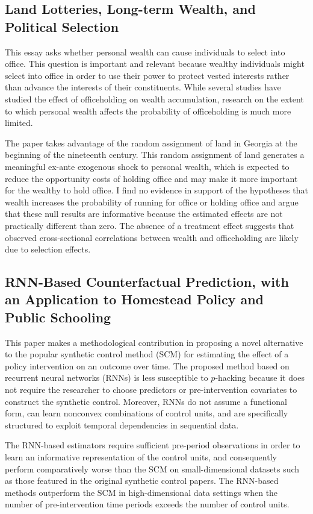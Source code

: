 \subsection{Land Lotteries, Long-term Wealth, and Political Selection} 
This essay asks whether personal wealth can cause individuals to select into office. This question is important and relevant because wealthy individuals might select into office in order to use their power to protect vested interests rather than advance the interests of their constituents. While several studies have studied the effect of officeholding on wealth accumulation, research on the extent to which personal wealth affects the probability of officeholding is much more limited.

The paper takes advantage of the random assignment of land in Georgia at the beginning of the nineteenth century. This random assignment of land generates a meaningful ex-ante exogenous shock to personal wealth, which is expected to reduce the opportunity costs of holding office and may make it more important for the wealthy to hold office. I find no evidence in support of the hypotheses that wealth increases the probability of running for office or holding office and argue that these null results are informative because the estimated effects are not practically different than zero. The absence of a treatment effect suggests that observed cross-sectional correlations between wealth and officeholding are likely due to selection effects. 

\subsection{RNN-Based Counterfactual Prediction, with an Application to Homestead Policy and Public Schooling}

This paper makes a methodological contribution in proposing a novel alternative to the popular synthetic control method (SCM) for estimating the effect of a policy intervention on an outcome over time. The proposed method based on recurrent neural networks (RNNs) is less susceptible to $p$-hacking because it does not require the researcher to choose predictors or pre-intervention covariates to construct the synthetic control. Moreover, RNNs do not assume a functional form, can learn nonconvex combinations of control units, and are specifically structured to exploit temporal dependencies in sequential data.

The RNN-based estimators require sufficient pre-period observations in order to learn an informative representation of the control units, and consequently perform comparatively worse than the SCM on small-dimensional datasets such as those featured in the original synthetic control papers. The RNN-based methods outperform the SCM in high-dimensional data settings when the number of pre-intervention time periods exceeds the number of control units.

